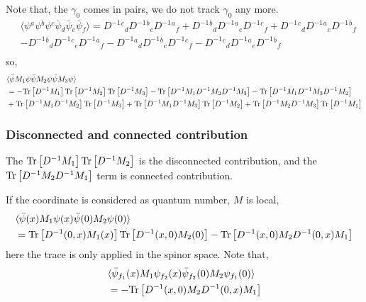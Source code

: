 Note that, the $\gamma _0$ comes in pairs, we do not track $\gamma _0$ any more.
\begin{equation}
\begin{split}
&\langle \psi {}^a \psi {}^b \psi {}^c \bar{\psi}{}_d \bar{\psi}{}_e \bar{\psi} {}_f \rangle = D^{-1} {}^c{}_d D^{-1} {}^b{}_e D^{-1} {}^a{}_f + D^{-1} {}^b{}_d D^{-1} {}^a{}_e D^{-1} {}^c{}_f + D^{-1} {}^c{}_d D^{-1} {}^a{}_e D^{-1} {}^b{}_f \\
& - D^{-1} {}^b{}_d D^{-1} {}^c{}_e D^{-1} {}^a{}_f -D^{-1} {}^a{}_d D^{-1} {}^b{}_e D^{-1} {}^c{}_f -D^{-1} {}^c{}_d D^{-1} {}^a{}_e D^{-1} {}^b{}_f\\
\end{split}
\end{equation}
so,
\begin{equation}
\begin{split}
&\langle \bar{\psi} M_1 \psi \bar{\psi} M_2 \psi \bar{\psi} M_3 \psi\rangle \\
&= -{\rm Tr}\left[D^{-1}  M_1\right]{\rm Tr}\left[D^{-1}M_2\right]{\rm Tr}\left[D^{-1}M_3\right] - {\rm Tr}\left[D^{-1} M_1 D^{-1} M_2 D^{-1} M_3\right] - {\rm Tr}\left[D^{-1} M_1 D^{-1} M_3 D^{-1} M_2\right]\\
& + {\rm Tr}\left[D^{-1} M_1 D^{-1} M_2\right]{\rm Tr}\left[D^{-1}M_3\right] + {\rm Tr}\left[D^{-1} M_1 D^{-1} M_3\right]{\rm Tr}\left[D^{-1}M_2\right] + {\rm Tr}\left[D^{-1} M_2 D^{-1} M_3\right]{\rm Tr}\left[D^{-1}M_1\right]\\
\end{split}
\end{equation}


\subsubsection{\label{DisconnectedAndConnected}Disconnected and connected contribution}

The ${\rm Tr}\left[D^{-1}  M_1\right]{\rm Tr}\left[D^{-1}M_2\right]$ is the disconnected contribution, and the ${\rm Tr}\left[D^{-1} M_2 D^{-1} M_1\right]$ term is connected contribution.

If the coordinate is considered as quantum number, $M$ is local,
\begin{equation}
\begin{split}
&\langle \bar{\psi}(x) M_1 \psi (x) \bar{\psi}(0) M_2 \psi (0)\rangle \\
&= {\rm Tr}\left[D^{-1}(0,x) M_1(x)\right] {\rm Tr}\left[D^{-1}(x, 0)M_2(0)\right] - {\rm Tr}\left[D^{-1}(x,0) M_2 D^{-1}(0, x) M_1\right]\\
\end{split}
\end{equation}
here the trace is only applied in the spinor space. Note that,
\begin{equation}
\begin{split}
&\langle \bar{\psi}_{f_1}(x) M_1 \psi _{f_2}(x) \bar{\psi}_{f_2}(0) M_2 \psi_{f_1} (0)\rangle \\
&= - {\rm Tr}\left[D^{-1}(x,0) M_2 D^{-1}(0, x) M_1\right]\\
\end{split}
\end{equation}


